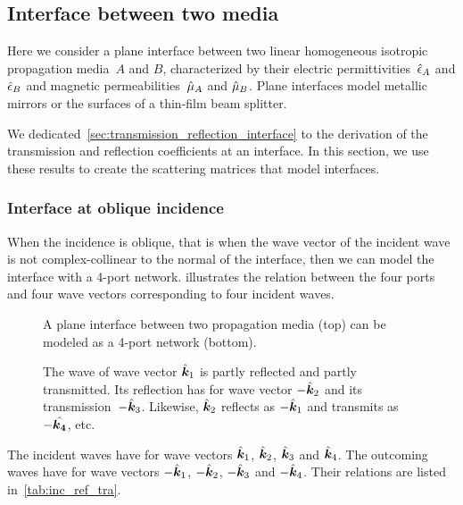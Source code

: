
\subsection{Interface between two media}
\label{sec:interface_between_two_media}

Here we consider a plane interface between two linear homogeneous isotropic propagation media~$A$ and $B$, characterized by their electric permittivities~$\hat{\epsilon}_A$ and $\hat{\epsilon}_B$ and magnetic permeabilities~$\hat{\mu}_A$ and $\hat{\mu}_B$.
Plane interfaces model metallic mirrors or the surfaces of a thin-film beam splitter.

We dedicated~\cref{sec:transmission_reflection_interface} to the derivation of the transmission and reflection coefficients at an interface.
In this section, we use these results to create the scattering matrices that model interfaces.

\subsubsection{Interface at oblique incidence}
When the incidence is oblique, that is when the wave vector of the incident wave is not complex-collinear to the normal of the interface, then we can model the interface with a 4-port network.
 illustrates the relation between the four ports and four wave vectors corresponding to four incident waves.

\begin{figure}[hbtp]
    \centering
    
    \caption{A plane interface between two propagation media (top) can be modeled as a 4-port network (bottom).}
    \caption*{The wave of wave vector $\hat{\bm{k}}_1$ is partly reflected and partly transmitted.
    Its reflection has for wave vector $-\hat{\bm{k}}_2$ and its transmission~$-\hat{\bm{k}}_3$.
    Likewise, $\hat{\bm{k}}_2$ reflects as $-\hat{\bm{k}}_1$ and transmits as $-\hat{\bm{k_4}}$, etc.
    }
    \label{fig:network_interface}
\end{figure}

The incident waves have for wave vectors
$\hat{\bm{k}}_1$, $\hat{\bm{k}}_2$, $\hat{\bm{k}}_3$ and $\hat{\bm{k}}_4$.
The outcoming waves have for wave vectors
$-\hat{\bm{k}}_1$, $-\hat{\bm{k}}_2$, $-\hat{\bm{k}}_3$ and $-\hat{\bm{k}}_4$.
Their relations are listed in~\cref{tab:inc_ref_tra}.

